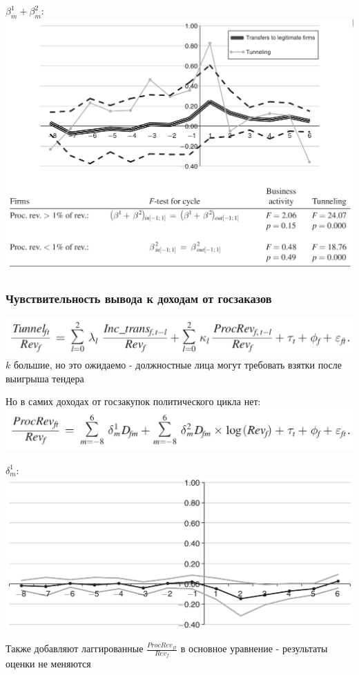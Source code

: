 \begin{frame}
$\beta^1_m + \beta^2_m$:
\includegraphics[scale=0.25]{images/legit_trans}
\end{frame}

\begin{frame}
\frametitle{Чувствительность вывода к доходам от госзаказов}
\includegraphics[scale=0.3]{images/tunnelling_from_procurement}
$k$ большие, но это ожидаемо - должностные лица могут требовать взятки после выигрыша тендера
\end{frame}

\begin{frame}
Но в самих доходах от госзакупок политического цикла нет:
\includegraphics[scale=0.3]{images/tunnelling_from_procurement2}\\
\vspace{3mm}

$\delta^1_m$:\\
\includegraphics[scale=0.25]{images/tunnelling_from_procurement3}
\vspace{3mm}

Также добавляют лаггированные $\frac{ProcRev_{ft}}{Rev_f}$ в основное уравнение - результаты оценки не меняются
\end{frame}

